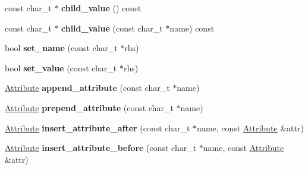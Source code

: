 \begin{DoxyCompactItemize}
\item 
\hypertarget{classphys_1_1xml_1_1Node_aaa50cedf42226b2f3865f2dc5275b589}{
const char\_\-t $\ast$ {\bfseries child\_\-value} () const }
\label{d7/d0a/classphys_1_1xml_1_1Node_aaa50cedf42226b2f3865f2dc5275b589}

\item 
\hypertarget{classphys_1_1xml_1_1Node_a483a61a6ab2ccb84cb33a0228630b1c3}{
const char\_\-t $\ast$ {\bfseries child\_\-value} (const char\_\-t $\ast$name) const }
\label{d7/d0a/classphys_1_1xml_1_1Node_a483a61a6ab2ccb84cb33a0228630b1c3}

\item 
\hypertarget{classphys_1_1xml_1_1Node_aa8c259aaaf405d9332130f40ca6679fc}{
bool {\bfseries set\_\-name} (const char\_\-t $\ast$rhs)}
\label{d7/d0a/classphys_1_1xml_1_1Node_aa8c259aaaf405d9332130f40ca6679fc}

\item 
\hypertarget{classphys_1_1xml_1_1Node_a765ff43292ade8e24c5b7b2808f3c7de}{
bool {\bfseries set\_\-value} (const char\_\-t $\ast$rhs)}
\label{d7/d0a/classphys_1_1xml_1_1Node_a765ff43292ade8e24c5b7b2808f3c7de}

\item 
\hypertarget{classphys_1_1xml_1_1Node_a33b7c276f62e0c25ff7833a897888125}{
\hyperlink{classphys_1_1xml_1_1Attribute}{Attribute} {\bfseries append\_\-attribute} (const char\_\-t $\ast$name)}
\label{d7/d0a/classphys_1_1xml_1_1Node_a33b7c276f62e0c25ff7833a897888125}

\item 
\hypertarget{classphys_1_1xml_1_1Node_abc20afab0e50b0d9c578a02e91608226}{
\hyperlink{classphys_1_1xml_1_1Attribute}{Attribute} {\bfseries prepend\_\-attribute} (const char\_\-t $\ast$name)}
\label{d7/d0a/classphys_1_1xml_1_1Node_abc20afab0e50b0d9c578a02e91608226}

\item 
\hypertarget{classphys_1_1xml_1_1Node_aae7d7e21d419c9f95549d14ddccb1334}{
\hyperlink{classphys_1_1xml_1_1Attribute}{Attribute} {\bfseries insert\_\-attribute\_\-after} (const char\_\-t $\ast$name, const \hyperlink{classphys_1_1xml_1_1Attribute}{Attribute} \&attr)}
\label{d7/d0a/classphys_1_1xml_1_1Node_aae7d7e21d419c9f95549d14ddccb1334}

\item 
\hypertarget{classphys_1_1xml_1_1Node_a0b22783a8ce773f7b3847d7f2ec9b475}{
\hyperlink{classphys_1_1xml_1_1Attribute}{Attribute} {\bfseries insert\_\-attribute\_\-before} (const char\_\-t $\ast$name, const \hyperlink{classphys_1_1xml_1_1Attribute}{Attribute} \&attr)}
\label{d7/d0a/classphys_1_1xml_1_1Node_a0b22783a8ce773f7b3847d7f2ec9b475}


\end{DoxyCompactItemize}
